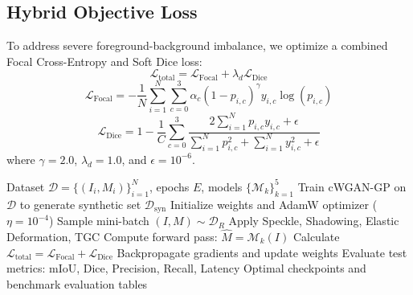 \documentclass[conference]{IEEEtran}
\begin{document}
\subsection{Hybrid Objective Loss}
To address severe foreground-background imbalance, we optimize a combined Focal Cross-Entropy and Soft Dice loss:
\begin{equation}
    \mathcal{L}_{\text{total}} = \mathcal{L}_{\text{Focal}} + \lambda_d \mathcal{L}_{\text{Dice}}
\end{equation}
\begin{equation}
    \mathcal{L}_{\text{Focal}} = - \frac{1}{N} \sum_{i=1}^N \sum_{c=0}^3 \alpha_c (1 - p_{i, c})^\gamma y_{i, c} \log(p_{i, c})
\end{equation}
\begin{equation}
    \mathcal{L}_{\text{Dice}} = 1 - \frac{1}{C} \sum_{c=0}^3 \frac{2 \sum_{i=1}^N p_{i, c} y_{i, c} + \epsilon}{\sum_{i=1}^N p_{i, c}^2 + \sum_{i=1}^N y_{i, c}^2 + \epsilon}
\end{equation}
where $\gamma = 2.0$, $\lambda_d = 1.0$, and $\epsilon = 10^{-6}$.

\begin{algorithm}[t]
\caption{End-to-End Fetal Ultrasound Benchmark Pipeline}
\label{alg:pipeline}
\begin{algorithmic}[1]
\REQUIRE Dataset $\mathcal{D} = \{(I_i, M_i)\}_{i=1}^N$, epochs $E$, models $\{\mathcal{M}_k\}_{k=1}^5$
\STATE Train cWGAN-GP on $\mathcal{D}$ to generate synthetic set $\mathcal{D}_{\text{syn}}$
        \STATE Initialize weights and AdamW optimizer ($\eta = 10^{-4}$)
            \STATE Sample mini-batch $(I, M) \sim \mathcal{D}_R$
                \STATE Apply Speckle, Shadowing, Elastic Deformation, TGC
            \ENDIF
            \STATE Compute forward pass: $\hat{M} = \mathcal{M}_k(I)$
            \STATE Calculate $\mathcal{L}_{\text{total}} = \mathcal{L}_{\text{Focal}} + \mathcal{L}_{\text{Dice}}$
            \STATE Backpropagate gradients and update weights
        \ENDFOR
        \STATE Evaluate test metrics: mIoU, Dice, Precision, Recall, Latency
    \ENDFOR
\ENDFOR
\RETURN Optimal checkpoints and benchmark evaluation tables
\end{algorithmic}
\end{algorithm}

\end{document}
